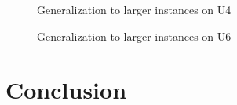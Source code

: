 \documentclass[lettersize,journal]{IEEEtran}
\begin{document}
	
	
	\begin{figure}[htb]
		\caption{Generalization to larger instances on U4}
		\label{Fig. 6}
		\vspace{-1.5pc}
	\end{figure}
	
	\begin{figure}[htb]
		\caption{Generalization to larger instances on U6}
		\label{Fig. 7}
	\end{figure}
	
	\section{Conclusion}
	
\end{document}

